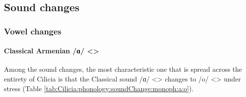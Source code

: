 \subsection{Sound changes}

\subsubsection{Vowel changes}

\paragraph{Classical Armenian /ɑ/ <> }
Among the sound changes, the most characteristic one that is spread across the entirety of Cilicia is that the Classical sound /ɑ/ <> changes to /o/ <> under stress (Table \ref{tab:Cilicia:phonology:soundChange:monoph:a:o}). 




